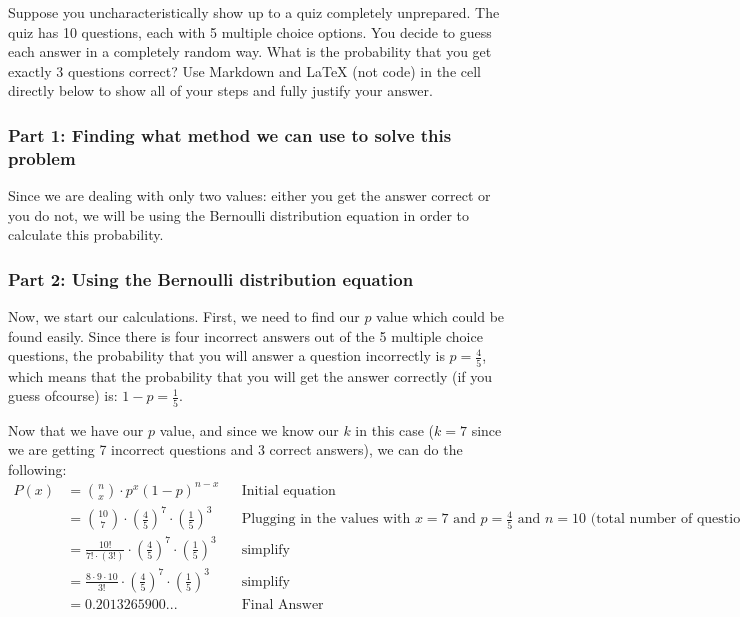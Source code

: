 \documentclass[11pt]{article}
\begin{document}
Suppose you uncharacteristically show up to a quiz completely
unprepared. The quiz has 10 questions, each with 5 multiple choice
options. You decide to guess each answer in a completely random way.
What is the probability that you get exactly 3 questions correct? Use
Markdown and LaTeX (not code) in the cell directly below to show all of
your steps and fully justify your answer.

    \subsubsection{\texorpdfstring{\textbf{Part 1: Finding what method we
can use to solve this
problem}}{Part 1: Finding what method we can use to solve this problem}}\label{part-1-finding-what-method-we-can-use-to-solve-this-problem}

Since we are dealing with only two values: either you get the answer
correct or you do not, we will be using the Bernoulli distribution
equation in order to calculate this probability.

\subsubsection{\texorpdfstring{\textbf{Part 2: Using the Bernoulli
distribution
equation}}{Part 2: Using the Bernoulli distribution equation}}\label{part-2-using-the-bernoulli-distribution-equation}

Now, we start our calculations. First, we need to find our \(p\) value
which could be found easily. Since there is four incorrect answers out
of the 5 multiple choice questions, the probability that you will answer
a question incorrectly is \(p = \frac{4}{5}\), which means that the
probability that you will get the answer correctly (if you guess
ofcourse) is: \(1 -p = \frac{1}{5}.\)

Now that we have our \(p\) value, and since we know our \(k\) in this
case (\(k = 7\) since we are getting 7 incorrect questions and 3 correct
answers), we can do the following: \[
\begin{align*}
    P(x)  &= \binom{n}{x} \cdot p^x (1-p)^{n - x} && \text{Initial equation} \\
    &= \binom{10}{7} \cdot (\frac{4}{5}) ^{7} \cdot (\frac{1}{5})^{3} && \text{Plugging in the values with $x = 7$ and $p = \frac{4}{5}$ and $n = 10$ (total number of questions)} \\
    &= \frac{10!}{7! \cdot (3!)} \cdot (\frac{4}{5}) ^{7} \cdot (\frac{1}{5})^{3} && \text{simplify} \\
    &= \frac{8 \cdot 9 \cdot 10}{3!} \cdot (\frac{4}{5}) ^{7} \cdot (\frac{1}{5})^{3} && \text{simplify} \\
    &= 0.2013265900 ... && \text{Final Answer}
\end{align*}
\]
\end{document}
